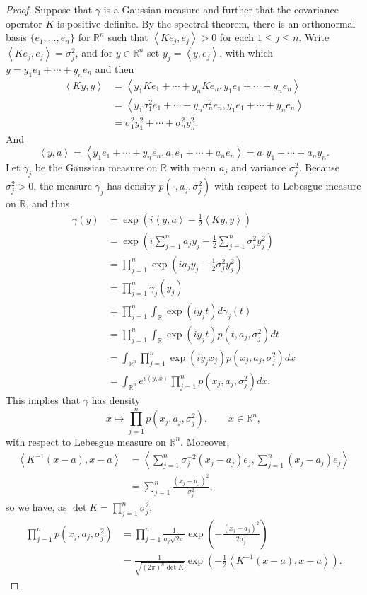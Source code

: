 \documentclass{article}
\newcommand{\inner}[2]{\left\langle #1, #2 \right\rangle}
\theoremstyle{definition}
\theoremstyle{definition}
\begin{document}
\begin{proof}
Suppose that $\gamma$ is a Gaussian measure and  further  that the covariance operator $K$ is positive definite. By the spectral theorem,
there is an orthonormal basis $\{e_1,\ldots,e_n\}$ for $\mathbb{R}^n$ such that $\inner{Ke_j}{e_j}>0$ for each
$1 \leq j \leq n$. Write $\inner{Ke_j}{e_j}=\sigma_j^2$, and for $y \in \mathbb{R}^n$ set
$y_j = \inner{y}{e_j}$, with which $y = y_1e_1 + \cdots + y_n e_n$ and then
\begin{align*}
\inner{Ky}{y} &= \inner{y_1Ke_1+\cdots+y_nKe_n}{y_1e_1+\cdots+y_ne_n}\\
&=\inner{y_1\sigma_1^2 e_1+ \cdots + y_n \sigma_n^2 e_n}{y_1e_1+\cdots+y_ne_n}\\
&=\sigma_1^2 y_1^2  + \cdots +  \sigma_n^2 y_n^2.
\end{align*}
And
\[
\inner{y}{a} = \inner{y_1e_1+\cdots+y_ne_n}{a_1e_1+\cdots+a_ne_n}
=a_1 y_1 + \cdots + a_n y_n.
\]
Let $\gamma_j$ be the Gaussian measure on $\mathbb{R}$ with mean $a_j$ and variance $\sigma_j^2$.
Because $\sigma_j^2>0$, the measure $\gamma_j$ has
density $p(\cdot,a_j,\sigma_j^2)$ with respect to Lebesgue measure on $\mathbb{R}$, and thus
\begin{align*}
\widetilde{\gamma}(y)&=\exp\left(i \inner{y}{a} - \frac{1}{2} \inner{Ky}{y} \right)\\
&= \exp\left(i \sum_{j=1}^n a_j y_j - \frac{1}{2} \sum_{j=1}^n \sigma_j^2 y_j^2 \right)\\
 &=\prod_{j=1}^n \exp\left(ia_jy_j - \frac{1}{2} \sigma_j^2 y_j^2 \right)\\
 &=\prod_{j=1}^n \widetilde{\gamma_j}(y_j)\\
 &=\prod_{j=1}^n \int_{\mathbb{R}} \exp(iy_j t) d\gamma_j(t)\\
 &=\prod_{j=1}^n \int_{\mathbb{R}} \exp(iy_j t) p(t,a_j,\sigma_j^2) dt\\
 &=\int_{\mathbb{R}^n} \prod_{j=1}^n \exp(iy_j x_j) p(x_j,a_j,\sigma_j^2) dx\\
 &=\int_{\mathbb{R}^n} e^{i\inner{y}{x}} \prod_{j=1}^n p(x_j,a_j,\sigma_j^2) dx.
\end{align*}
This implies that $\gamma$ has density
\[
x \mapsto \prod_{j=1}^n p(x_j,a_j,\sigma_j^2), \qquad x \in \mathbb{R}^n,
\]
with respect to Lebesgue measure on $\mathbb{R}^n$.
Moreover,
\begin{align*}
\inner{K^{-1}(x-a)}{x-a}&=\inner{\sum_{j=1}^n \sigma_j^{-2} (x_j-a_j)e_j}{\sum_{j=1}^n (x_j-a_j)e_j}\\
&=\sum_{j=1}^n  \frac{(x_j-a_j)^2}{\sigma_j^2},
\end{align*}
so we have, as $\det K = \prod_{j=1}^n \sigma_j^2$,
\begin{align*}
\prod_{j=1}^n p(x_j,a_j,\sigma_j^2) &= 
\prod_{j=1}^n  \frac{1}{\sigma_j \sqrt{2\pi}}  \exp\left( - \frac{(x_j-a_j)^2}{2\sigma_j^2} \right)\\
&=\frac{1}{\sqrt{(2\pi)^n \det K}} \exp\left(-\frac{1}{2} \inner{K^{-1}(x-a)}{x-a} \right).
\end{align*}
\end{proof}
\end{document}
